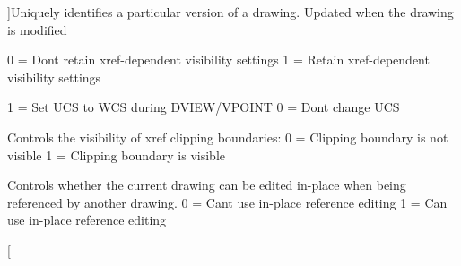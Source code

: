\begin{Desc}
\begin{description}
{}]Uniquely identifies a particular version of a drawing. Updated when the drawing is modified \item[{\em 
V\+I\+S\+R\+E\+T\+A\+IN\hypertarget{class_c_a_d_header_abd894aab7aa85b4c4634e67fb93d6886abdcc83230c295f567caf2781a8b59ea1}{}\label{class_c_a_d_header_abd894aab7aa85b4c4634e67fb93d6886abdcc83230c295f567caf2781a8b59ea1}
}]0 = Don\textquotesingle{}t retain xref-\/dependent visibility settings 1 = Retain xref-\/dependent visibility settings \item[{\em 
W\+O\+R\+L\+D\+V\+I\+EW\hypertarget{class_c_a_d_header_abd894aab7aa85b4c4634e67fb93d6886ab2930a2e265052312bd759bfc0ec6cf1}{}\label{class_c_a_d_header_abd894aab7aa85b4c4634e67fb93d6886ab2930a2e265052312bd759bfc0ec6cf1}
}]1 = Set U\+CS to W\+CS during D\+V\+I\+E\+W/\+V\+P\+O\+I\+NT 0 = Don\textquotesingle{}t change U\+CS \item[{\em 
X\+C\+L\+I\+P\+F\+R\+A\+ME\hypertarget{class_c_a_d_header_abd894aab7aa85b4c4634e67fb93d6886a61c00c87ceffb9a84a4b96275fa5d77c}{}\label{class_c_a_d_header_abd894aab7aa85b4c4634e67fb93d6886a61c00c87ceffb9a84a4b96275fa5d77c}
}]Controls the visibility of xref clipping boundaries\+: 0 = Clipping boundary is not visible 1 = Clipping boundary is visible \item[{\em 
X\+E\+D\+IT\hypertarget{class_c_a_d_header_abd894aab7aa85b4c4634e67fb93d6886abfdc739888ced20da3813e30d448ae18}{}\label{class_c_a_d_header_abd894aab7aa85b4c4634e67fb93d6886abfdc739888ced20da3813e30d448ae18}
}]Controls whether the current drawing can be edited in-\/place when being referenced by another drawing. 0 = Can\textquotesingle{}t use in-\/place reference editing 1 = Can use in-\/place reference editing \item[{\em 
}
\end{description}
\end{Desc}
